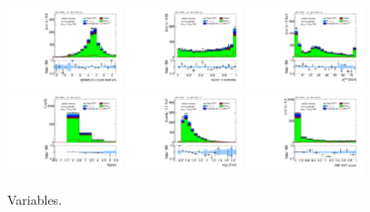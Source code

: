 \begin{figure}[!htpb]
  \includegraphics[width=0.30\textwidth]{figures/analysis/vbf-WlvCR/jets-etaprod}
  \includegraphics[width=0.30\textwidth]{figures/analysis/vbf-WlvCR/lep-eta-centrality}
  \includegraphics[width=0.30\textwidth]{figures/analysis/vbf-WlvCR/system-pt} \\
  \includegraphics[width=0.30\textwidth]{figures/analysis/vbf-WlvCR/n-jets30}
  \includegraphics[width=0.30\textwidth]{figures/analysis/vbf-WlvCR/dijet-m-veryhigh}
  \includegraphics[width=0.30\textwidth]{figures/analysis/vbf-WlvCR/BDTEve-VBF} \\
  \caption{Variables.}
  \label{fig:backgrounds-WlvCR-jets}
\end{figure}

